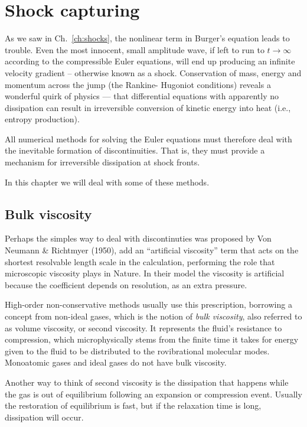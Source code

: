 

\chapter{Shock capturing}

As we saw in Ch.~\ref{ch:shocks}, the nonlinear term in Burger's
equation leads to trouble. Even the most innocent, small amplitude
wave, if left to run to $t \rightarrow \infty$ according to the compressible
Euler equations, will end up producing an infinite velocity
gradient -- otherwise known as a shock. Conservation of
mass, energy and momentum across the jump (the Rankine-
Hugoniot conditions) reveals a wonderful quirk of physics —
that differential equations with apparently no dissipation can
result in irreversible conversion of kinetic energy into heat
(i.e., entropy production).

All numerical methods for solving the Euler equations must
therefore deal with the inevitable formation of discontinuities.
That is, they must provide a mechanism for irreversible
dissipation at shock fronts.

In this chapter we will deal with some of these methods. 

\section{Bulk viscosity}

Perhaps the simples way to deal with discontinuties was proposed by Von Neumann
\& Richtmyer (1950), add an ``artificial viscosity''
term that acts on the shortest resolvable length scale in the
calculation, performing the role that microscopic viscosity
plays in Nature. In their model the viscosity is artificial
because the coefficient depends on resolution, as an extra pressure.

High-order non-conservative methods usually use this prescription,
borrowing a concept from non-ideal gases, which is the notion
of {\it bulk viscosity}, also referred to as volume viscosity, or second
viscosity. It represents the fluid's resistance to
compression, which microphysically stems from the finite
time it takes for energy given to the fluid to be distributed to the
rovibrational molecular modes. Monoatomic gases and ideal gases do not have bulk
viscosity.

Another way to think of second viscosity is the dissipation that
happens while the gas is out of equilibrium following an expansion or
compression event. Usually the restoration of equilibrium is fast, but
if the relaxation time is long, dissipation will occur. 

